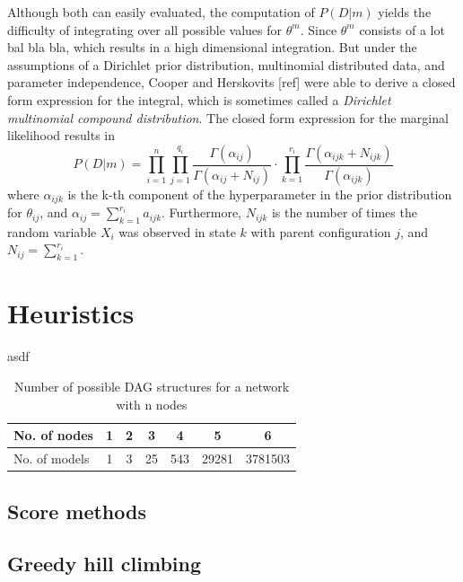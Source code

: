 \documentclass{article}
\begin{document}
  Although both can easily evaluated, the computation of $P(D|m)$ yields the difficulty of integrating
  over all possible values for $\theta^m$. Since $\theta^m$ consists of a lot bal bla bla, which results
  in a high dimensional integration. But under the assumptions of a Dirichlet prior distribution,
  multinomial distributed data, and parameter independence, Cooper and Herskovits	[ref] were able
  to derive a closed form expression for the integral, which is sometimes called a
  \textit{Dirichlet multinomial compound distribution}. The closed form expression for the marginal
  likelihood results in
  \[
  	P(D|m)=\prod_{i=1}^n \prod_{j=1}^{q_i} \frac{\Gamma(\alpha_{ij})}{\Gamma(\alpha_{ij}+N_{ij})}
  	\cdot \prod_{k=1}^{r_i} \frac{\Gamma(\alpha_{ijk}+N_{ijk})}{\Gamma(\alpha_{ijk})}
  \]
  where $\alpha_{ijk}$ is the k-th component of the hyperparameter in the prior distribution for
  $\theta_{ij}$, and $\alpha_{ij}=\sum_{k=1}^{r_i}a_{ijk}$. Furthermore, $N_{ijk}$ is the number
  of times the random variable $X_i$ was observed in state $k$ with parent configuration $j$, and
  $N_{ij} = \sum_{k=1}^{r_i}$. 

\section{Heuristics}
	asdf
	\begin{table}[t]
	\caption{Number of possible DAG structures for a network with n nodes}
	\begin{center}
		\begin{small}
			\begin{sc}
				\begin{tabular}{lcccccc}
					\hline
					No. of nodes    & 1 & 2 & 3 & 4 & 5 & 6\\
					\hline
					No. of models   & 1 & 3 & 25 & 543 & 29281 & 3781503\\
					\hline
				\end{tabular}
			\end{sc}
		\end{small}
	\end{center}
	\vskip -0.1in
	\end{table}
	

	\subsection{Score methods}
	\subsection{Greedy hill climbing}
\end{document}
